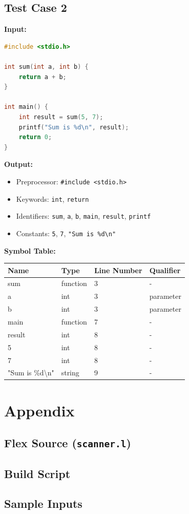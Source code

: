 \documentclass[12pt,a4paper]{article}
\begin{document}
\subsection*{Test Case 2}
\textbf{Input:}
\begin{lstlisting}[language=C]
#include <stdio.h>

int sum(int a, int b) {
    return a + b;
}

int main() {
    int result = sum(5, 7);
    printf("Sum is %d\n", result);
    return 0;
}
\end{lstlisting}

\textbf{Output:}
\begin{itemize}
    \item Preprocessor: \texttt{\#include <stdio.h>}
    \item Keywords: \texttt{int}, \texttt{return}
    \item Identifiers: \texttt{sum}, \texttt{a}, \texttt{b}, \texttt{main}, \texttt{result}, \texttt{printf}
    \item Constants: \texttt{5}, \texttt{7}, \texttt{"Sum is \%d\textbackslash n"}
\end{itemize}


\textbf{Symbol Table:}
\begin{tabularx}{\linewidth}{|l|l|l|l|}
\hline
\textbf{Name} & \textbf{Type} & \textbf{Line Number} & \textbf{Qualifier} \\
\hline
sum & function & 3 & - \\
a & int & 3 & parameter \\
b & int & 3 & parameter \\
main & function & 7 & - \\
result & int & 8 & - \\
5 & int & 8 & - \\
7 & int & 8 & - \\
"Sum is \%d\textbackslash n" & string & 9 & - \\
\hline
\end{tabularx}
\section*{Appendix}
\subsection*{Flex Source (\texttt{scanner.l})}


\subsection*{Build Script}


\subsection*{Sample Inputs}


\end{document}
